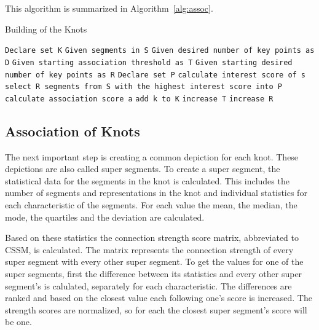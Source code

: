 This algorithm is summarized in Algorithm~\ref{alg:assoc}.

\begin{algorithm}
\caption{Building of the Knots}\label{alg:assoc}
\begin{algorithmic}
\State \texttt{Declare set K}
\State \texttt{Given segments in S}
\State \texttt{Given desired number of key points as D}
\State \texttt{Given starting association threshold as T}
\State \texttt{Given starting desired number of key points as R}
    \State \texttt{Declare set P}
        \State \texttt{calculate interest score of s}
    \EndFor
    \State \texttt{select R segments from S with the highest interest score into P}
            \State \texttt{calculate association score a}
            \EndIf
        \EndFor
        \State \texttt{add k to K}
    \EndFor
    \State \texttt{increase T}
    \State \texttt{increase R}
\EndWhile
\end{algorithmic}
\end{algorithm}

\subsection{Association of Knots} %
\label{subsec:assoc_knots}

The next important step is creating a common depiction for each knot. These depictions are also called super segments. To create a super segment, the statistical data for the segments in the knot is calculated. This includes the number of segments and representations in the knot and individual statistics for each characteristic of the segments. For each value the mean, the median, the mode, the quartiles and the deviation are calculated.

Based on these statistics the connection strength score matrix, abbreviated to CSSM, is calculated. The matrix represents the connection strength of every super segment with every other super segment. To get the values for one of the super segments, first the difference between its statistics and every other super segment's is calulated, separately for each characteristic. The differences are ranked and based on the closest value each following one's score is increased. The strength scores are normalized, so for each the closest super segment's score will be one.

